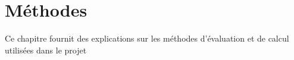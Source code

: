 \chapter{Méthodes}

Ce chapitre fournit des explications sur les méthodes d'évaluation et de calcul utilisées dans le projet 






